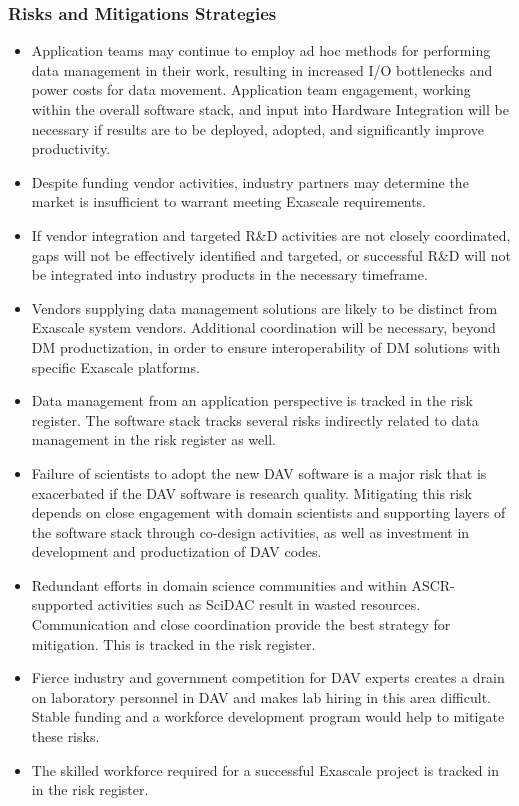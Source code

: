 \subsubsection{Risks and Mitigations Strategies}
\begin{itemize}
\item Application teams may continue to employ ad hoc methods for performing data management in their work, resulting in increased I/O bottlenecks and power costs for data movement. Application team engagement, working within the overall software stack, and input into Hardware Integration will be necessary if results are to be deployed, adopted, and significantly improve productivity.
\item Despite funding vendor activities, industry partners may determine the market is insufficient to warrant meeting Exascale requirements.
\item If vendor integration and targeted R\&D activities are not closely coordinated, gaps will not be effectively identified and targeted, or successful R\&D will not be integrated into industry products in the necessary timeframe.
\item Vendors supplying data management solutions are likely to be distinct from Exascale system vendors. Additional coordination will be necessary, beyond DM productization, in order to ensure interoperability of DM solutions with specific Exascale platforms.
\item Data management from an application perspective is tracked in the risk register. The software stack tracks several risks indirectly related to data management in the risk register as well.
\item Failure of scientists to adopt the new DAV software is a major risk that is exacerbated if the DAV software is research quality. Mitigating this risk depends on close engagement with domain scientists and supporting layers of the software stack through co-design activities, as well as investment in development and productization of DAV codes.
\item Redundant efforts in domain science communities and within ASCR-supported activities such as SciDAC result in wasted resources. Communication and close coordination provide the best strategy for mitigation. This is tracked in the risk register.
\item Fierce industry and government competition for DAV experts creates a drain on laboratory personnel in DAV and makes lab hiring in this area difficult. Stable funding and a workforce development program would help to mitigate these risks.
\item The skilled workforce required for a successful Exascale project is tracked in in the risk register.
\end{itemize}